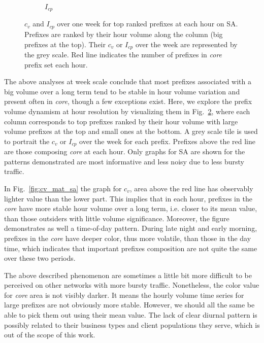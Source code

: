 \begin{figure}
\begin{subfigure}[b]{0.85\textwidth}
                \caption{$I_{cp}$}
                \label{fig:cp_mat_sa}
        \end{subfigure}
\caption{$c_v$ and $I_{cp}$ over one week for top ranked prefixes at each hour on SA. Prefixes are ranked by their hour volume along the column (big prefixes at the top). Their $c_v$ or $I_{cp}$ over the week are represented by the grey scale. Red line indicates the number of prefixes in \textit{core} prefix set each hour.}
\label{fig:cv_cp_mat}
\end{figure}

The above analyses at week scale conclude that most prefixes associated with a big volume over a long term tend to be stable in hour volume variation and present often in \textit{core}, though a few exceptions exist.
Here, we explore the prefix volume dynamism at hour resolution by visualizing them in Fig.~\ref{fig:cv_cp_mat}, where each column corresponds to top prefixes ranked by their hour volume with large volume prefixes at the top and small ones at the bottom. A grey scale tile is used to portrait the $c_v$ or $I_{cp}$ over the week for each prefix. Prefixes above the red line are those composing \textit{core} at each hour.
Only graphs for SA are shown for the patterns demonstrated are most informative and less noisy due to less bursty traffic.

In Fig.~\ref{fig:cv_mat_sa} the graph for $c_v$, area above the red line has observably lighter value than the lower part. 
This implies that in each hour, prefixes in the \textit{core} have more stable hour volume over a long term, i.e. closer to its mean value,  than those outsiders with little volume significance.
Moreover, the figure demonstrates as well a time-of-day pattern. 
During late night and early morning, prefixes in the \textit{core} have deeper color, thus more volatile, than those in the day time, which indicates that important prefixes composition are not quite the same over these two periods.

The above described phenomenon are sometimes a little bit more difficult to be perceived on other networks with more bursty traffic. 
Nonetheless, the color value for \textit{core} area is not visibly darker.
It means the hourly volume time series for large prefixes are not obviously more stable.
However, we should all the same be able to pick them out using their mean value.
The lack of clear diurnal pattern is possibly related to their business types and client populations they serve, which is out of the scope of this work.

